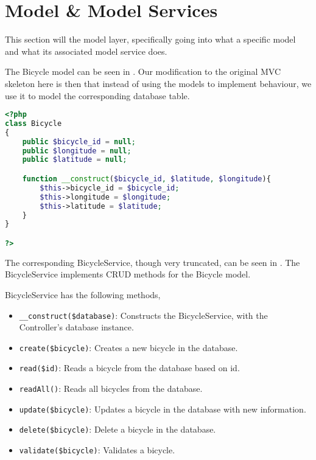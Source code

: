 \section{Model \& Model Services}
This section will the model layer, specifically going into what a specific model and what its associated model service does.

The Bicycle model can be seen in . Our modification to the original MVC skeleton here is then that instead of using the models to implement behaviour, we use it to model the corresponding database table.

\begin{minipage}{\textwidth}
\begin{lstlisting}[language=php, label=lst:bicycleModel]
<?php
class Bicycle
{
    public $bicycle_id = null;
    public $longitude = null;
    public $latitude = null;

    function __construct($bicycle_id, $latitude, $longitude){
        $this->bicycle_id = $bicycle_id;
        $this->longitude = $longitude;
        $this->latitude = $latitude;
    }
}

?>
\end{lstlisting}
\end{minipage}

The corresponding BicycleService, though very truncated, can be seen in . The BicycleService implements CRUD methods for the Bicycle model.

BicycleService has the following methods,

\begin{itemize}
\item \lstinline|__construct($database)|: Constructs the BicycleService, with the Controller's database instance.
\item \lstinline|create($bicycle)|: Creates a new bicycle in the database.
\item \lstinline|read($id)|: Reads a bicycle from the database based on id.
\item \lstinline|readAll()|: Reads all bicycles from the database.
\item \lstinline|update($bicycle)|: Updates a bicycle in the database with new information.
\item \lstinline|delete($bicycle)|: Delete a bicycle in the database.
\item \lstinline|validate($bicycle)|: Validates a bicycle.
\end{itemize}

